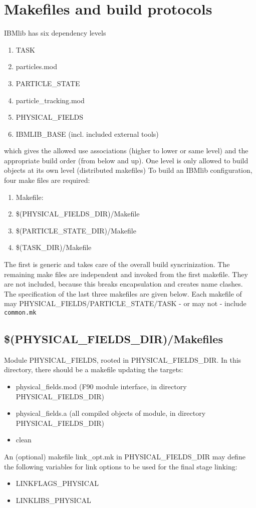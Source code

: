 \chapter{Makefiles and build protocols}


IBMlib has six dependency levels
\begin{enumerate}
  \item TASK 
  \item particles.mod
  \item PARTICLE\_STATE 
  \item particle\_tracking.mod
  \item PHYSICAL\_FIELDS 
  \item IBMLIB\_BASE (incl. included external tools)  
\end{enumerate}
which gives the allowed use associations (higher to lower or same level) 
and the appropriate build order (from below and up).
One level is only allowed to build objects at its own level (distributed makefiles)
To build an IBMlib configuration, four make files are required:
\begin{enumerate}
  \item Makefile:     
  \item \$(PHYSICAL\_FIELDS\_DIR)/Makefile
  \item \$(PARTICLE\_STATE\_DIR)/Makefile  
  \item \$(TASK\_DIR)/Makefile          
\end{enumerate}
The first is generic and takes care of the overall build syncrinization.
The remaining make files are independent and invoked from the first makefile.
They are not included, because this breaks encapsulation and creates
name clashes. 
The specification of the last three makefiles are given below.
Each makefile of may PHYSICAL\_FIELDS/PARTICLE\_STATE/TASK 
- or may not - include {\tt common.mk}

\section{\$(PHYSICAL\_FIELDS\_DIR)/Makefiles }

Module PHYSICAL\_FIELDS, rooted in PHYSICAL\_FIELDS\_DIR. In this directory, there
should be a makefile updating the targets:
\begin{itemize}
  \item physical\_fields.mod (F90 module interface, in directory PHYSICAL\_FIELDS\_DIR)
  \item physical\_fields.a   (all compiled objects of module, in directory PHYSICAL\_FIELDS\_DIR)
  \item clean
\end{itemize}
An (optional) makefile link\_opt.mk in PHYSICAL\_FIELDS\_DIR may define the following 
variables for link options to be used for the final stage linking:
\begin{itemize}
  \item LINKFLAGS\_PHYSICAL
  \item LINKLIBS\_PHYSICAL 
\end{itemize}

